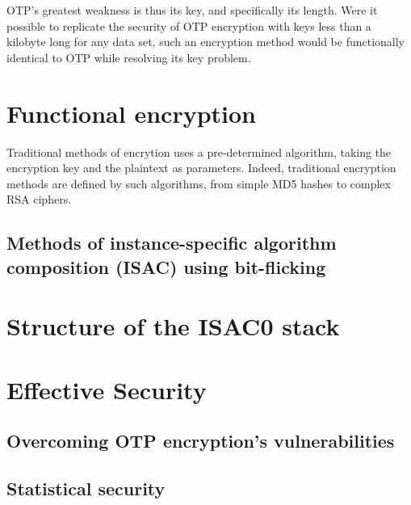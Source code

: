 \documentclass[12pt]{article}
\begin{document}
OTP's greatest weakness is thus its key, and specifically its length. Were it possible to replicate the security of OTP encryption with keys less than a kilobyte long for any data set, such an encryption method would be functionally identical to OTP while resolving its key problem.

\section{Functional encryption}

Traditional methods of encrytion uses a pre-determined algorithm, taking the encryption key and the plaintext as parameters. Indeed, traditional encryption methods are defined by such algorithms, from simple MD5 hashes to complex RSA ciphers.

\subsection{Methods of instance-specific algorithm composition (ISAC) using bit-flicking}

\section{Structure of the ISAC0 stack}

\section{Effective Security}

\subsection{Overcoming OTP encryption's vulnerabilities}

\subsection{Statistical security}
\end{document}
